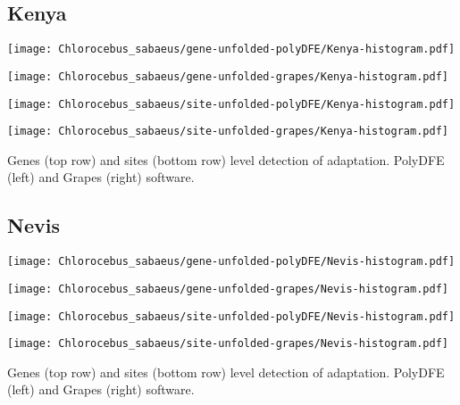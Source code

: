 \documentclass{article}
\begin{document}
\subsection{Kenya}
\centering
\begin{minipage}{0.49\linewidth}
    \texttt{[image: Chlorocebus\_sabaeus/gene-unfolded-polyDFE/Kenya-histogram.pdf]}
\end{minipage}%
\hfill
\begin{minipage}{0.49\linewidth}
    \texttt{[image: Chlorocebus\_sabaeus/gene-unfolded-grapes/Kenya-histogram.pdf]}
\end{minipage}
\begin{minipage}{0.49\linewidth}
    \texttt{[image: Chlorocebus\_sabaeus/site-unfolded-polyDFE/Kenya-histogram.pdf]}
\end{minipage}%
\hfill
\begin{minipage}{0.49\linewidth}
    \texttt{[image: Chlorocebus\_sabaeus/site-unfolded-grapes/Kenya-histogram.pdf]}
\end{minipage}
\flushleft
Genes (top row) and sites (bottom row) level detection of adaptation.
PolyDFE (left) and Grapes (right) software.

\subsection{Nevis}
\centering
\begin{minipage}{0.49\linewidth}
    \texttt{[image: Chlorocebus\_sabaeus/gene-unfolded-polyDFE/Nevis-histogram.pdf]}
\end{minipage}%
\hfill
\begin{minipage}{0.49\linewidth}
    \texttt{[image: Chlorocebus\_sabaeus/gene-unfolded-grapes/Nevis-histogram.pdf]}
\end{minipage}
\begin{minipage}{0.49\linewidth}
    \texttt{[image: Chlorocebus\_sabaeus/site-unfolded-polyDFE/Nevis-histogram.pdf]}
\end{minipage}%
\hfill
\begin{minipage}{0.49\linewidth}
    \texttt{[image: Chlorocebus\_sabaeus/site-unfolded-grapes/Nevis-histogram.pdf]}
\end{minipage}
\flushleft
Genes (top row) and sites (bottom row) level detection of adaptation.
PolyDFE (left) and Grapes (right) software.
\end{document}
